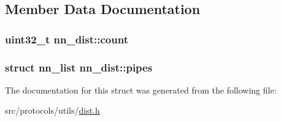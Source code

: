 \subsection{Member Data Documentation}
\subsubsection[{count}]{\setlength{\rightskip}{0pt plus 5cm}uint32\+\_\+t nn\+\_\+dist\+::count}\hypertarget{structnn__dist_a334300196bd129e8c909122435bef82a}{}\label{structnn__dist_a334300196bd129e8c909122435bef82a}
\subsubsection[{pipes}]{\setlength{\rightskip}{0pt plus 5cm}struct {\bf nn\+\_\+list} nn\+\_\+dist\+::pipes}\hypertarget{structnn__dist_a9ebfbe8b26a7da288e04b2cb6fd6c6f9}{}\label{structnn__dist_a9ebfbe8b26a7da288e04b2cb6fd6c6f9}


The documentation for this struct was generated from the following file\+:\begin{DoxyCompactItemize}
\item 
src/protocols/utils/\hyperlink{dist_8h}{dist.\+h}\end{DoxyCompactItemize}
